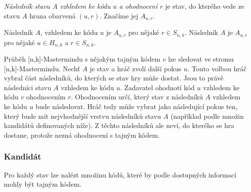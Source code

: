 \begin{definice}\label{potomek}
  
  \emph{Následník stavu $A$ vzhledem ke kódu $u$ a ohodnocení $r$} je stav, do kterého vede ze stavu $A$ hrana obarvená $(u,r)$. Značíme jej $A_{u,r}$. 
  
\end{definice}
\begin{pozn}
    Následník $A$, vzhledem ke kódu $u$ je $A_{u,r}$ pro nějaké $r \in S_{n,k}$. Následník $A$ je $A_{u,r}$ pro nějaké $u\in H_{n,k}$ a $r \in S_{n,k}$. 
\end{pozn}

Průběh [n,k]-Mastermindu s nějakým tajným kódem $v$ lze sledovat ve stromu [n,k]-Mastermindu. Nechť $A$ je stav a hráč zvolí další pokus $u$. Touto volbou hráč vybral část následníků, do kterých se stav hry může dostat. Jsou to právě následníci stavu $A$ vzhledem ke kódu $u$. Zadavatel ohodnotí kód $u$ vzhledem ke kódu $v$ ohodnocením $r$. Ohodnocením určí, který stav z následníků $A$ vzhledem ke kódu $u$ bude následovat. Hráč tedy může vybrat jako následující pokus ten, který bude mít nejvhodnější vrstvu následníků stavu $A$ (například podle množin kandidátů definovaných níže). Z těchto následníků ale neví, do kterého se hra dostane, protože nezná ohodnocení s tajným kódem. 


\subsubsection{Kandidát}
Pro každý stav lze nalézt množinu kódů, které by podle dostupných informací mohly být tajným kódem. 

